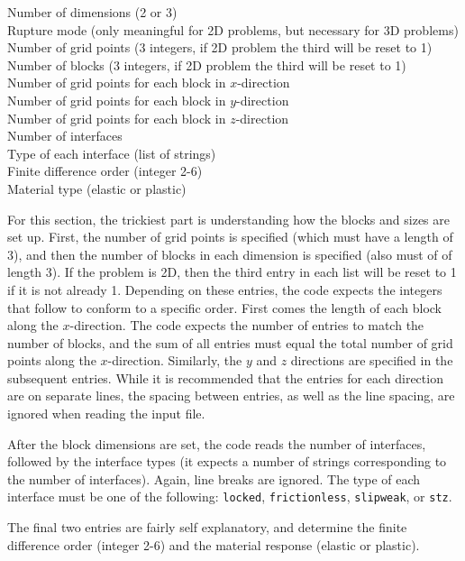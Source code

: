 \documentclass[12pt]{article}   	%
\begin{document}
\vspace{0.1in}
Number of dimensions (2 or 3) \\
\indent Rupture mode (only meaningful for 2D problems, but necessary for 3D problems) \\
\indent Number of grid points (3 integers, if 2D problem the third will be reset to 1) \\
\indent Number of blocks (3 integers, if 2D problem the third will be reset to 1) \\
\indent Number of grid points for each block in $x$-direction \\
\indent Number of grid points for each block in $y$-direction \\
\indent Number of grid points for each block in $z$-direction \\
\indent Number of interfaces \\
\indent Type of each interface (list of strings)\\
\indent Finite difference order (integer 2-6)\\
\indent Material type (elastic or plastic)

\vspace{0.1in}
\noindent For this section, the trickiest part is understanding how the blocks and sizes are set up. First, the number of grid points is specified (which must have a length of 3), and then the number of blocks in each dimension is specified (also must of of length 3). If the problem is 2D, then the third entry in each list will be reset to 1 if it is not already 1. Depending on these entries, the code expects the integers that follow to conform to a specific order. First comes the length of each block along the $x$-direction. The code expects the number of entries to match the number of blocks, and the sum of all entries must equal the total number of grid points along the $x$-direction. Similarly, the $y$ and $z$ directions are specified in the subsequent entries. While it is recommended that the entries for each direction are on separate lines, the spacing between entries, as well as the line spacing, are ignored when reading the input file.

After the block dimensions are set, the code reads the number of interfaces, followed by the interface types (it expects a number of strings corresponding to the number of interfaces). Again, line breaks are ignored. The type of each interface must be one of the following: {\tt locked}, {\tt frictionless}, {\tt slipweak}, or {\tt stz}.

The final two entries are fairly self explanatory, and determine the finite difference order (integer 2-6) and the material response (elastic or plastic).
\end{document}
